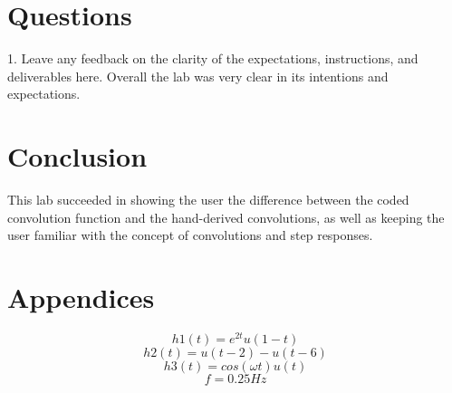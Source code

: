 \documentclass[12pt]{article}
\begin{document}
\section{Questions}
1. Leave any feedback on the clarity of the expectations, instructions, and deliverables here.\newline
Overall the lab was very clear in its intentions and expectations.

\section{Conclusion}
This lab succeeded in showing the user the difference between the coded convolution function and the hand-derived convolutions, as well as keeping the user familiar with the concept of convolutions and step responses.
\clearpage
\centering
\section*{Appendices}
\[h1(t)= e^{2t} u(1 − t)\]
\[h2(t)= u(t − 2) − u(t − 6)\]
\[h3(t)= cos(\omega t) u(t)\] 
\[f = 0.25Hz\]

\clearpage
\end{document}
